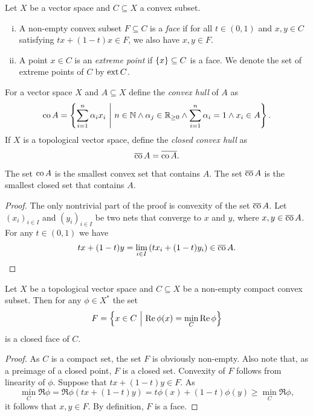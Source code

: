 \begin{definicija}
Let $X$ be a vector space and $C \subseteq X$ a convex subset.

\begin{enumerate}[i)]
\item A non-empty convex subset $F \subseteq C$ is a
\emph{face} if for all $t \in (0, 1)$ and $x, y \in C$
satisfying $tx + (1-t)x \in F$, we also have $x, y \in F$.
\item A point $x \in C$ is an
\emph{extreme point} if $\left\{x\right\} \subseteq C$
is a face. We denote the set of extreme points of $C$ by $\operatorname{ext} C$.
\end{enumerate}
\end{definicija}

\begin{definicija}
For a vector space $X$ and $A \subseteq X$ define the
\emph{convex hull} of $A$ as
\[
\operatorname{co} A =
\left\{\sum_{i=1}^n \alpha_i x_i~\middle\vert~n \in \mathbb{N} \land \alpha_j \in \mathbb{R}_{\geq 0} \land
\sum_{i=1}^n \alpha_i = 1 \land x_i \in A\right\}.
\]
If $X$ is a topological vector space, define the
\emph{closed convex hull} as
\[
\overline{\operatorname{co}}\,A = \overline{\operatorname{co} A}.
\]
\end{definicija}

\begin{trditev}
The set $\operatorname{co} A$ is the smallest convex set that contains $A$. The
set $\overline{\operatorname{co}}\,A$ is the smallest closed set that contains $A$.
\end{trditev}

\begin{proof}
The only nontrivial part of the proof is convexity of the set
$\overline{\operatorname{co}}\,A$. Let $(x_i)_{i \in I}$ and $(y_i)_{i \in I}$ be
two nets that converge to $x$ and $y$, where
$x, y \in \overline{\operatorname{co}}\,A$. For any $t \in (0, 1)$ we have
\[
tx + (1-t)y =
\lim_{i \in I} \left(t x_i + (1-t) y_i\right) \in
\overline{\operatorname{co}}\,A. \qedhere
\]
\end{proof}

\begin{lema}
\label{conv:lm:cls_face}
Let $X$ be a topological vector space and $C \subseteq X$ be a
non-empty compact convex subset. Then for any $\phi \in X^*$ the
set
\[
F = \left\{x \in C~\middle\vert~\operatorname{Re} \phi(x) = \min_C \operatorname{Re} \phi\right\}
\]
is a closed face of $C$.
\end{lema}

\begin{proof}
As $C$ is a compact set, the set $F$ is obviously non-empty. Also
note that, as a preimage of a closed point, $F$ is a closed set.
Convexity of $F$ follows from linearity of $\phi$. Suppose that
$tx + (1-t)y \in F$. As
\[
\min_C \Re \phi =
\Re \phi(tx + (1-t)y) =
t \phi(x) + (1-t) \phi(y) \geq
\min_C \Re \phi,
\]
it follows that $x, y \in F$. By definition, $F$ is a face.
\end{proof}

